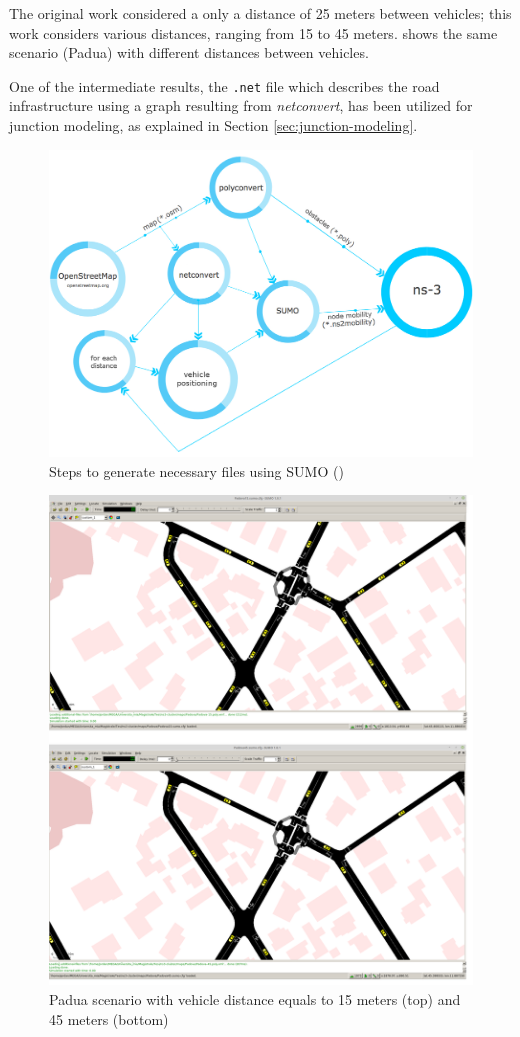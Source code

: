 		The original work considered a only a distance of 25 meters between vehicles; this work considers various distances, ranging from 15 to 45 meters.   shows the same scenario (Padua) with different distances between vehicles.
		
		
		One of the intermediate results, the \texttt{.net} file which describes the road infrastructure using a graph resulting from \textit{netconvert}, has been utilized for junction modeling, as explained in Section \ref{sec:junction-modeling}.
		\begin{figure}[H]
			\centering
			\includegraphics[width=\textwidth]{immagini/sumo-process}
			\caption{Steps to generate necessary files using SUMO (\cite{ROM2017})}
			\label{fig:sumo-process}
		\end{figure}
		
		\begin{figure}[H]
			\centering
			\includegraphics[width=\textwidth]{immagini/sumo-distances}
			\caption{Padua scenario with vehicle distance equals to 15 meters (top) and 45 meters (bottom)}
			\label{fig:sumo-distances}
		\end{figure}
